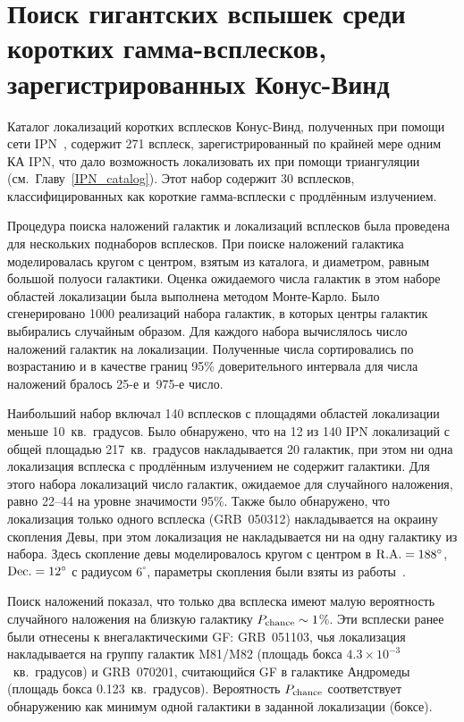 \section{Поиск гигантских вспышек среди коротких гамма-всплесков, 
зарегистрированных Конус-Винд}\label{GF_search}

Каталог локализаций коротких всплесков Конус-Винд, полученных при помощи 
сети IPN~\citep{Palshin2013}, содержит 271 всплеск, зарегистрированный 
по крайней мере одним КА IPN, что дало возможность локализовать их при помощи 
триангуляции (см.~Главу~\ref{IPN_catalog}). Этот набор содержит 30 всплесков, 
классифицированных как короткие гамма-всплески с продлённым излучением.

Процедура поиска наложений галактик и локализаций всплесков была проведена 
для нескольких поднаборов всплесков.  При поиске наложений галактика моделировалась 
кругом с центром, взятым из каталога, и диаметром, равным большой полуоси галактики. 
Оценка ожидаемого числа галактик в этом наборе областей локализации была выполнена 
методом Монте-Карло. Было сгенерировано 1000 реализаций набора галактик, в которых 
центры галактик выбирались случайным образом. Для каждого набора вычислялось число 
наложений галактик на локализации. Полученные числа сортировались по возрастанию 
и в качестве границ 95\% доверительного интервала для числа наложений 
бралось 25-е и~975-е число.

Наибольший набор включал 140 всплесков с площадями областей локализации 
меньше 10~кв.~градусов.
Было обнаружено, что на 12 из 140 IPN локализаций с общей площадью 217~кв.~градусов 
накладывается 20 галактик, при этом ни одна локализация всплеска с продлённым 
излучением не содержит галактики. Для этого набора локализаций число галактик, 
ожидаемое для случайного наложения, равно 22--44 на уровне значимости 95\%. 
Также было обнаружено, что локализация только одного всплеска (GRB~050312) 
накладывается на окраину скопления Девы, при этом локализация не накладывается 
ни на одну галактику из набора. Здесь скопление девы моделировалось кругом с центром в 
${\mathrm{R.A.}}=188^\circ$, ${\mathrm{Dec.}}=12^\circ$ с радиусом $6^\circ$, 
параметры скопления были взяты из работы~\citep{Binggeli1987}.

Поиск наложений показал, что только два всплеска имеют малую вероятность случайного 
наложения на близкую галактику $P_{\mathrm{chance}} \sim 1$\%. Эти всплески ранее были 
отнесены к внегалактическими GF: GRB~051103, чья локализация накладывается на группу галактик M81/M82 
(площадь бокса $4.3\times10^{-3}$~кв.~градусов) и GRB~070201, считающийся GF в галактике 
Андромеды (площадь бокса 0.123~кв.~градусов). Вероятность $P_{{\mathrm{chance}}}$ 
соответствует обнаружению как минимум одной галактики в заданной локализации (боксе).

